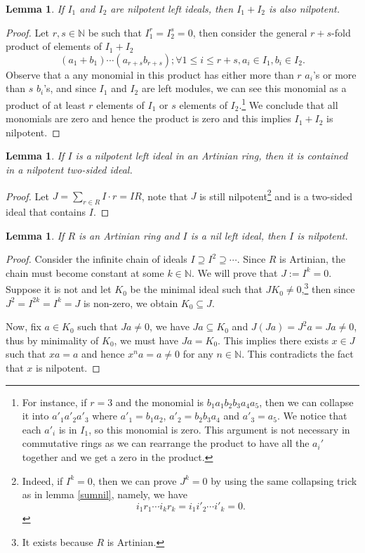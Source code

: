 \documentclass{tufte-handout} %
\newtheorem{lem}[thm]{Lemma}
\theoremstyle{definition}
\theoremstyle{remark}
\newcommand{\N}{\mathbb{N}}
\begin{document}
\begin{lem}\label{sumnilp}
	If $I_1$ and $I_2$ are nilpotent left ideals, then $I_1 + I_2$ is also nilpotent. %
\end{lem}
\begin{proof}
	Let $r,s \in\N$ be such that $I_1^r = I_2^s = 0$, then consider the general $r+s$-fold product of elements of $I_1+I_2$
	\[(a_1+b_1)\cdots (a_{r+s}b_{r+s}); \forall 1\leq i\leq r+s, a_i \in I_1, b_i \in I_2.\]
	Observe that a any monomial in this product has either more than $r$ $a_i$'s or more than $s$ $b_i$'s, and since $I_1$ and $I_2$ are left modules, we can see this monomial as a product of at least $r$ elements of $I_1$ or $s$ elements of $I_2$.\footnote{For instance, if $r = 3$ and the monomial is $b_1a_1b_2b_3a_4a_5$, then we can collapse it into $a'_1a'_2a'_3$ where $a'_1 = b_1a_2$, $a'_2 = b_2b_3a_4$ and $a'_3 = a_5$. We notice that each $a'_i$ is in $I_1$, so this monomial is zero. This argument is not necessary in commutative rings as we can rearrange the product to have all the $a_i'$ together and we get a zero in the product.} We conclude that all monomials are zero and hence the product is zero and this implies $I_1+I_2$ is nilpotent.
\end{proof}
\begin{lem}
	If $I$ is a nilpotent left ideal in an Artinian ring, then it is contained in a nilpotent two-sided ideal.
\end{lem}
\begin{proof}
	Let $J = \sum_{r \in R} I\cdot r = IR$, note that $J$ is still nilpotent\footnote{Indeed, if $I^k= 0$, then we can prove $J^k = 0$ by using the same collapsing trick as in lemma \ref{sumnil}, namely, we have 
	\[i_1r_1\cdots i_kr_k = i_1i'_2\cdots i'_k = 0.\]} and is a two-sided ideal that contains $I$.
\end{proof}
\begin{lem}\label{nilisnilp}
	If $R$ is an Artinian ring and $I$ is a nil left ideal, then $I$ is nilpotent.
\end{lem}
\begin{proof}
	Consider the infinite chain of ideals 
	$I \supseteq I^2 \supseteq \cdots$. Since $R$ is Artinian, the chain must become constant at some $k \in \N$. We will prove that $J := I^k = 0$. Suppose it is not and let $K_0$ be the minimal ideal such that $JK_0 \neq 0$,\footnote{It exists because $R$ is Artinian.} then since $J^2 = I^{2k} = I^k = J$ is non-zero, we obtain $K_0 \subseteq J$.
	
	Now, fix $a \in K_0$ such that $Ja \neq 0$, we have $Ja \subseteq K_0$ and $J(Ja)= J^2a = Ja \neq 0$, thus by minimality of $K_0$, we must have $Ja = K_0$. This implies there exists $x \in J$ such that $xa = a$ and hence $x^na = a\neq 0$ for any $n \in \N$. This contradicts the fact that $x$ is nilpotent.
\end{proof}
\end{document}
